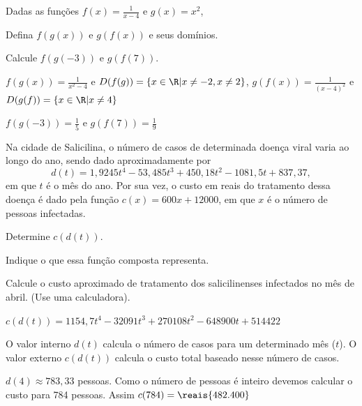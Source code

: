 \begin{exercises*}
\begin{exercise}
  Dadas as funções \(f(x)=\frac{1}{x-4}\) e \(g(x)=x^2\),
  \begin{alphalist}
    \item Defina  $f(g(x))$  e $g(f(x))$ e seus domínios.
    \item Calcule $f(g(-3))$ e $g(f(7))$.
  \end{alphalist}

  \begin{answer}
    \begin{alphalist}
      \item $f(g(x))= \frac{1}{x^2-4}$ e
            $D(f(g))=\{ x \in \R| x \neq -2, x \neq 2 \}$,
            $g(f(x))=\frac{1}{(x-4)^2}$ e
            $D(g(f))=\{ x \in \R| x \neq 4\}$
      \item $f(g(-3))= \frac{1}{5}$ e
            $g(f(7))= \frac{1}{9}$
    \end{alphalist}
  \end{answer}
\end{exercise}

\begin{exercise}
  Na cidade de Salicilina, o número de casos de determinada doença viral
  varia ao longo do ano, sendo dado aproximadamente por
  \[
    d(t) = 1,9245t^4 - 53,485t^3 + 450,18t^2 - 1081,5t + 837,37,
  \]
  em que $t$ é o mês do ano. Por sua vez, o custo em reais do tratamento
  dessa doença é dado pela função $c(x)=600x+12000$, em que $x$ é o número
  de pessoas infectadas.
  \begin{alphalist}
    \item Determine $c(d(t))$.
    \item Indique o que essa função composta representa.
    \item Calcule o custo aproximado de tratamento dos salicilinenses
          infectados no mês de abril. (Use uma calculadora).
  \end{alphalist}

  \begin{answer}
    \begin{alphalist}
      \item $c(d(t)) = 1154,7t^4 - 32091t^3 + 270108t^2 - 648900t + 514422$
      \item O valor interno $d(t)$ calcula o número de casos para um determinado
            mês ($t$). O valor externo $c(d(t))$ calcula o custo total baseado
            nesse número de casos.
      \item $d(4) \approx 783,33$ pessoas. Como o número de pessoas é inteiro
            devemos calcular o custo para 784 pessoas.
            Assim $c(784) = \reais{482.400}$
    \end{alphalist}
  \end{answer}
\end{exercise}

\end{exercises*}

